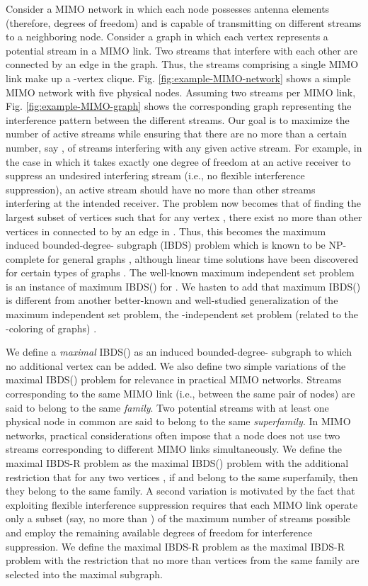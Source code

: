\documentclass[journal,12pt,onecolumn]{IEEEtran}
\begin{document}
Consider a MIMO network in which each node possesses  antenna
elements (therefore,  degrees of freedom) and is capable of
transmitting on  different streams to a neighboring node. Consider
a graph  in which each vertex represents a potential stream
in a MIMO link. Two streams that interfere with each other are
connected by an edge in the graph. 
Thus, the streams comprising a single MIMO link
make up a -vertex clique. 
Fig.\,\,\ref{fig:example-MIMO-network} shows
a simple MIMO network with five physical nodes. Assuming two streams
per MIMO link, Fig.\,\,\ref{fig:example-MIMO-graph} shows the
corresponding graph representing the interference pattern between the
different streams. 
Our goal is to maximize the number of active streams while ensuring that there are no more than
a certain number, say , of streams interfering with any given
active stream. For example, in the case in which it takes exactly one degree of freedom at an
active receiver to suppress an undesired
interfering stream (i.e., no flexible interference suppression), an
active stream should have no more than  other streams interfering
at the intended receiver. The problem now becomes 
that of finding the largest subset of vertices  such that for any vertex , there exist no more than
 other vertices in  connected to  by an edge in
. Thus, this becomes the maximum induced bounded-degree-
subgraph (IBDS) problem which is known to be NP-complete for general
graphs \cite{Tel1994}, although linear time solutions have been
discovered for certain types of graphs \cite{BodFlu1996}. 
The well-known maximum independent set problem is an instance of
maximum IBDS() for . We hasten to add that maximum IBDS() is
different from another better-known and well-studied generalization of the maximum
independent set problem, the -independent set problem (related to
the -coloring of graphs) \cite{West2001}.  

We define a {\em maximal} IBDS() as an induced bounded-degree-
subgraph to which no additional
vertex can be added. We also define two simple variations of the
maximal IBDS() problem for relevance in practical MIMO networks. Streams
corresponding to the same MIMO link (i.e., between the same pair of
nodes) are said to belong to the same {\em family}. Two
potential streams with at least one physical node in common are said
to belong to the same {\em superfamily}. In MIMO networks, practical
considerations often impose that a node does not
use two streams corresponding to different MIMO links
simultaneously. We define the maximal IBDS-R problem as 
the maximal IBDS() problem with the additional restriction that for
any two vertices , if  and  belong to
the same superfamily, then they belong to the same family. A second
variation is motivated by the fact that exploiting flexible
interference suppression requires that each MIMO link operate only a
subset (say, no more than ) of the maximum number of streams
possible and employ the remaining available degrees of freedom for interference
suppression. We define the maximal IBDS-R problem as the 
maximal IBDS-R problem with the restriction that no more than
 vertices from the same family are selected into the maximal 
subgraph. 
\end{document}
